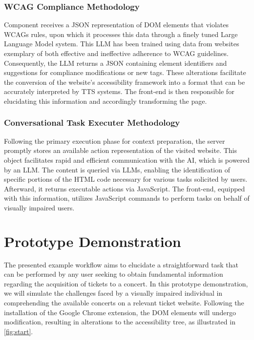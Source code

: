 \documentclass[conference]{IEEEtran}
\begin{document}
\subsubsection{WCAG Compliance Methodology}

Component receives a JSON representation of DOM elements that violates WCAGs rules, upon which it processes this data through a finely tuned Large Language Model system. This LLM has been trained using data from websites exemplary of both effective and ineffective adherence to WCAG guidelines. Consequently, the LLM returns a JSON containing element identifiers and suggestions for compliance modifications or new tags. These alterations facilitate the conversion of the website's accessibility framework into a format that can be accurately interpreted by TTS systems. The front-end is then responsible for elucidating this information and accordingly transforming the page.

\subsubsection{Conversational Task Executer Methodology}

Following the primary execution phase for context preparation, the server promptly stores an available action representation of the visited website. This object facilitates rapid and efficient communication with the AI, which is powered by an LLM. The content is queried via LLMs, enabling the identification of specific portions of the HTML code necessary for various tasks solicited by users. Afterward, it returns executable actions via JavaScript. The front-end, equipped with this information, utilizes JavaScript commands to perform tasks on behalf of visually impaired users.

\section{Prototype Demonstration}\label{demo}

The presented example workflow aims to elucidate a straightforward task that can be performed by any user seeking to obtain fundamental information regarding the acquisition of tickets to a concert. In this prototype demonstration, we will simulate the challenges faced by a visually impaired individual in comprehending the available concerts on a relevant ticket website. Following the installation of the Google Chrome extension, the DOM elements will undergo modification, resulting in alterations to the accessibility tree, as illustrated in \autoref{fig:start}.
\end{document}
